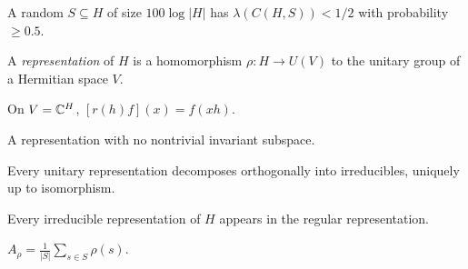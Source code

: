 \begin{theorem}
  \label{thm:alon-roichman-cayley}
  \notready
  A random $S\subseteq H$ of size $100\log|H|$ has $\lambda(C(H,S))<1/2$ with
  probability $\ge0.5$.
\end{theorem}

\begin{definition}
  \label{def:representation}
  \mathlibok
  A \emph{representation} of $H$ is a homomorphism $\rho:H\to U(V)$ to the
  unitary group of a Hermitian space $V$.
\end{definition}

\begin{definition}
  \label{def:regular-representation}
  \mathlibok
  On $V=\mathbb{C}^H$, $[r(h)f](x)=f(xh)$.
\end{definition}

\begin{definition}
  \label{def:irreducible}
  \mathlibok
  A representation with no nontrivial invariant subspace.
\end{definition}

\begin{proposition}
  \label{prop:maschke}
  \mathlibok
  Every unitary representation decomposes orthogonally into irreducibles,
  uniquely up to isomorphism.
\end{proposition}

\begin{proposition}
  \label{prop:regular-contains-irreps}
  \mathlibok
  Every irreducible representation of $H$ appears in the regular representation.
\end{proposition}

\begin{definition}
  \label{def:A-rho}
  $A_\rho=\tfrac1{|S|}\sum_{s\in S}\rho(s)$.
\end{definition}


